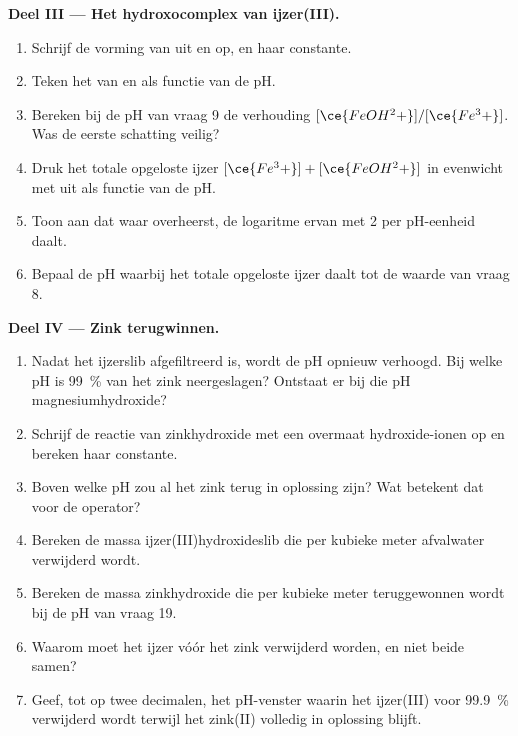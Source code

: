\begin{problem}
\medskip
\noindent\textbf{Deel III --- Het hydroxocomplex van ijzer(III).}
\begin{enumerate}[resume]
  \item Schrijf de vorming van  uit  en  op,
        en haar constante.
  \item Teken het  van  en  als
        functie van de pH.
  \item Bereken bij de pH van vraag 9 de verhouding
        $[\ce{FeOH^2+}]/[\ce{Fe^3+}]$. Was de eerste schatting veilig?
  \item Druk het totale opgeloste ijzer $[\ce{Fe^3+}] + [\ce{FeOH^2+}]$ in
        evenwicht met  uit als functie van de pH.
  \item Toon aan dat waar  overheerst, de logaritme ervan met
        2 per pH-eenheid daalt.
  \item Bepaal de pH waarbij het totale opgeloste ijzer daalt tot de
        waarde van vraag 8.
\end{enumerate}

\medskip
\noindent\textbf{Deel IV --- Zink terugwinnen.}
\begin{enumerate}[resume]
  \item Nadat het ijzerslib afgefiltreerd is, wordt de pH opnieuw
        verhoogd. Bij welke pH is \qty{99}{\percent} van het zink
        neergeslagen? Ontstaat er bij die pH magnesiumhydroxide?
  \item Schrijf de reactie van zinkhydroxide met een overmaat
        hydroxide-ionen op en bereken haar constante.
  \item Boven welke pH zou al het zink terug in oplossing zijn? Wat
        betekent dat voor de operator?
  \item Bereken de massa ijzer(III)hydroxideslib die per kubieke meter
        afvalwater verwijderd wordt.
  \item Bereken de massa zinkhydroxide die per kubieke meter teruggewonnen
        wordt bij de pH van vraag 19.
  \item Waarom moet het ijzer vóór het zink verwijderd worden, en niet
        beide samen?
  \item Geef, tot op twee decimalen, het pH-venster waarin het ijzer(III)
        voor \qty{99.9}{\percent} verwijderd wordt terwijl het zink(II)
        volledig in oplossing blijft.
\end{enumerate}
\end{problem}
